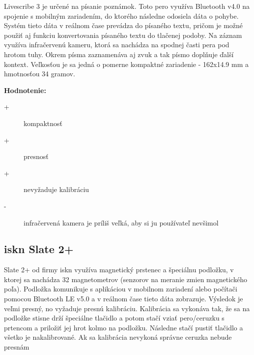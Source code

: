 Livescribe 3 je určené na písanie poznámok. Toto pero využíva Bluetooth v4.0 na spojenie s mobilným zariadením, do ktorého následne odosiela dáta o pohybe. Systém tieto dáta v reálnom čase prevádza do písaného textu, pričom je možné použiť aj funkciu konvertovania písaného textu do tlačenej podoby. Na záznam využíva infračervenú kameru, ktorá sa nachádza na spodnej časti pera pod hrotom tuhy. Okrem písma zaznamenáva aj zvuk a tak písmo doplňuje ďalší kontext. Veľkosťou je sa jedná o pomerne kompaktné zariadenie - 162x14.9 mm a hmotnosťou 34 gramov.\newline

\textbf{Hodnotenie:}
\begin{description}
	\item[+]{kompaktnosť}
	\item[+]{presnosť}
	\item[+]{nevyžaduje kalibráciu}
	\item[-]{infračervená kamera je príliš veľká, aby si ju používateľ nevšimol}
\end{description}

\subsection*{iskn Slate 2+}

Slate 2+ od firmy iskn využíva magnetický prstenec a špeciálnu podložku, v ktorej sa nachádza 32 magnetometrov (senzorov na meranie zmien magnetického poľa). Podložka komunikuje s aplikáciou v mobilnom zariadení alebo počítači pomocou Bluetooth LE v5.0 a v reálnom čase tieto dáta zobrazuje. Výsledok je veľmi presný, no vyžaduje presnú kalibráciu. Kalibrácia sa vykonáva tak, že sa na podložke stisne drží špeciálne tlačidlo a potom stačí vziať pero/ceruzku s prtencom a priložiť jej hrot kolmo na podložku. Následne stačí pustiť tlačidlo a všetko je nakalibrované. Ak sa kalibrácia nevykoná správne ceruzka nebude presnám \newline

